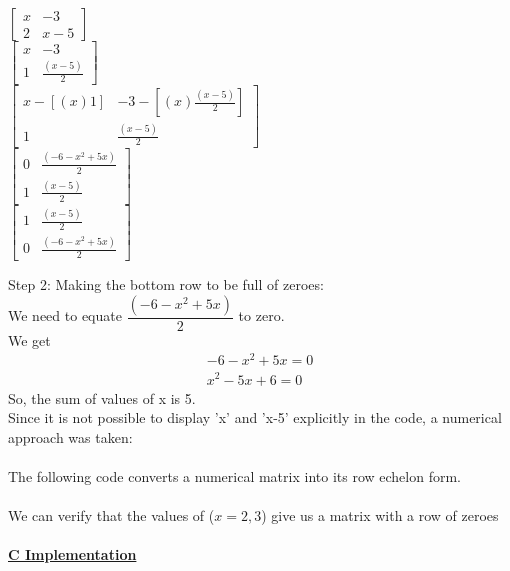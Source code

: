 \documentclass{article}
\begin{document}
\begin{center}
      $\begin{bmatrix}
        x&-3\\
        2&x-5 
        \end{bmatrix}$\bigskip\medskip\\
        $\begin{bmatrix}
        x&-3\\
        1&\frac{(x-5)}{2} 
        \end{bmatrix}$\bigskip\medskip\\
        $\begin{bmatrix}
        x-[(x)1]&-3-[(x)\frac{(x-5)}{2}]\\
        1&\frac{(x-5)}{2} 
        \end{bmatrix}$\bigskip\medskip\\
        $\begin{bmatrix}
        0&\frac{(-6-x^2+5x)}{2}\\
        1&\frac{(x-5)}{2} 
        \end{bmatrix}$\bigskip\medskip\\
        $\begin{bmatrix}
        1&\frac{(x-5)}{2}\\
        0&\frac{(-6-x^2+5x)}{2}
        \end{bmatrix}$\\  
\end{center}
\noindent Step 2: Making the bottom row to be full of zeroes:\medskip\\
We need to equate $\dfrac{(-6-x^2+5x)}{2}$ to zero.\\
We get 
\begin{align*}
    -6-x^2+5x=0\\
    x^2-5x+6=0
\end{align*}
So, the sum of values of x is 5.\medskip\\
Since it is not possible to display 'x' and 'x-5' explicitly in the code, a numerical approach was taken:\\\\
The following code converts a numerical matrix into its row echelon form.\\\\
We can verify that the values of ($x=2,3$) give us a matrix with a row of zeroes\\\\
\large \underline{\textbf{C Implementation}}\\
\end{document}
